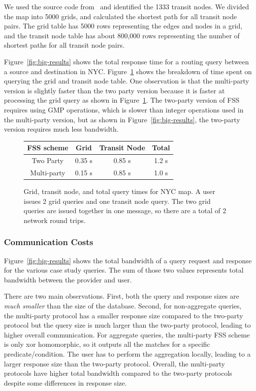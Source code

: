 We used the source code from~\cite{tnr} and identified the 1333 transit nodes. We divided the map into 5000 grids,
and calculated the shortest path for all transit node pairs. The grid table has 5000 rows
representing the edges and nodes in a grid, and the transit node table has about 800,000
rows representing the number of shortest paths for all transit node pairs. 

Figure~\ref{fig:big-results} shows the total response time for a routing query
between a source and destination in NYC. Figure~\ref{fig:map-results} shows
the breakdown of time spent on querying the grid and transit node table.
One observation is that the multi-party version is slightly faster than the two party
version because it is faster at processing the grid query as shown in Figure~\ref{fig:map-results}.
The two-party version of FSS requires using GMP operations, which is slower than integer operations
used in the multi-party version, but as shown in Figure~\ref{fig:big-results}, the two-party
version requires much less bandwidth.

\begin{figure}
	\centering
		\begin{tabular}{cccc}
			\toprule
			\bf FSS scheme & \bf Grid & \bf Transit Node & \bf Total \\
			\midrule
			Two Party & 0.35 s  & 0.85 s & 1.2 s \\
			Multi-party & 0.15 s & 0.85 s & 1.0 s \\
			\bottomrule
		\end{tabular}
	\caption[Grid, transit node, and total query times for NYC map.]
	{Grid, transit node, and total query times for NYC map. 
		A user issues 2 grid queries and one transit node query. The two grid queries
		are issued together in one message, so there are a total of 2 network round trips.}
	\label{fig:map-results}
\end{figure}

\subsubsection{Communication Costs}
\label{sec:communication}
Figure~\ref{fig:big-results} shows the total bandwidth of a query request and response
for the various case study queries. The sum of those
two values represents total bandwidth between the provider and user.

There are two main observations. First, both the query and response sizes are \textit{much smaller} than the size
of the database. Second, for non-aggregate queries, the multi-party protocol has 
a smaller response size compared to the two-party protocol but the query size is much larger
than the two-party protocol, leading to higher overall communication. 
For aggregate queries, the multi-party FSS scheme is only xor homomorphic, so
it outputs all the matches for a specific predicate/condition. The user has to perform
the aggregation locally, leading to a larger response size than the two-party protocol.
Overall, the multi-party protocols have higher total bandwidth compared to the two-party protocols
despite some differences in response size.

